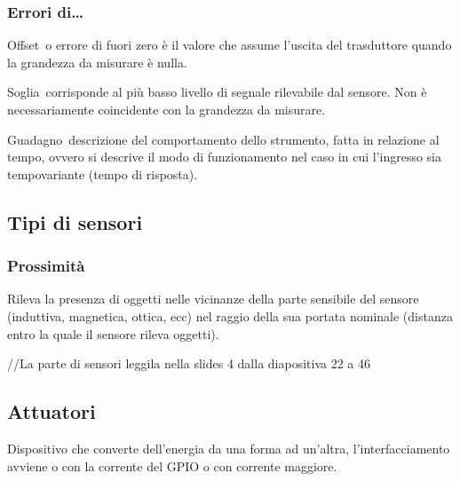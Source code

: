 \documentclass[
]{article}
\begin{document}
{}

\subsubsection{\texorpdfstring{{Errori
di\ldots{}}}{Errori di\ldots{}}}\label{h.lso0128fm55x}

{}

{Offset}{~o errore di fuori zero è il valore che assume l'uscita del
trasduttore quando la grandezza da misurare è nulla.}

{}

{Soglia}{~corrisponde al più basso livello di segnale rilevabile dal
sensore. Non è necessariamente coincidente con la grandezza da misurare.
}

{}

{Guadagno}{~descrizione del comportamento dello strumento, fatta in
relazione al tempo, ovvero si descrive il modo di funzionamento nel caso
in cui l'ingresso sia tempovariante (tempo di risposta).}

{}

{}

\subsection{\texorpdfstring{{Tipi di
sensori}}{Tipi di sensori}}\label{h.x5nq9sjvr6ue}

\subsubsection{\texorpdfstring{{Prossimità}}{Prossimità}}\label{h.6mmo5419jufc}

{Rileva la presenza di oggetti nelle vicinanze della parte sensibile del
sensore (induttiva, magnetica, ottica, ecc) nel raggio della sua portata
nominale (distanza entro la quale il sensore rileva oggetti).}

{}

{//La parte di sensori leggila nella slides 4 dalla diapositiva 22 a 46}

{}

{}

\subsection{\texorpdfstring{{Attuatori}}{Attuatori}}\label{h.af1fo8qh9k6x}

{Dispositivo che converte dell'energia da una forma ad un'altra,
l'interfacciamento avviene o con la corrente del GPIO o con corrente
maggiore.}
\end{document}
